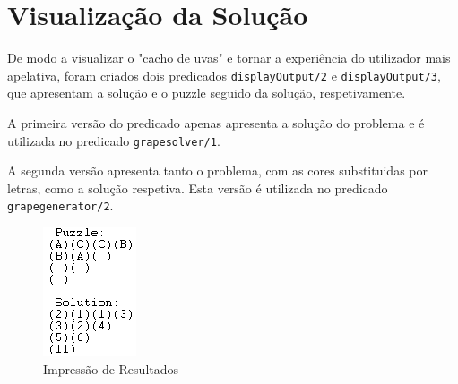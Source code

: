 \section{Visualização da Solução}
De modo a visualizar o "cacho de uvas" e tornar a experiência do utilizador mais apelativa, foram criados dois predicados \verb|displayOutput/2| e \verb|displayOutput/3|, que apresentam a solução e o puzzle seguido da solução, respetivamente.

A primeira versão do predicado apenas apresenta a solução do problema e é utilizada no predicado \verb|grapesolver/1|.

A segunda versão apresenta tanto o problema, com as cores substituidas por letras, como a solução respetiva. Esta versão é utilizada no predicado \verb|grapegenerator/2|.

\begin{figure}
    \centering
    \includegraphics{print.png}
    \caption{Impressão de Resultados}
    \label{fig: results}
\end{figure}